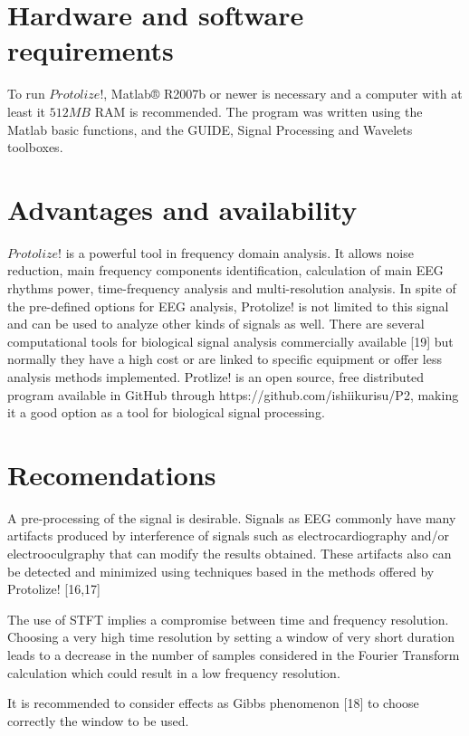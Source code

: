\documentclass[12pt, a4paper]{article}
\begin{document}
\section{Hardware and software requirements}

To run $Protolize!$, Matlab® R2007b or newer is necessary and a computer with at least it $512MB$ RAM is recommended. The program was written using the Matlab basic functions, and the GUIDE, Signal Processing and Wavelets toolboxes.

\section{Advantages and availability}

$Protolize!$ is a powerful tool in frequency domain analysis. It allows noise reduction, main frequency components identification, calculation of main EEG rhythms power, time-frequency analysis and multi-resolution analysis. In spite of the pre-defined options for EEG analysis, Protolize! is not limited to this signal and can be used to analyze other kinds of signals as well. There are several computational tools for biological signal analysis commercially available [19] but normally they have a high cost or are linked to specific equipment or offer less analysis methods implemented. Protlize! is an open source, free distributed program available in GitHub through https://github.com/ishiikurisu/P2, making it a good option as a tool for biological signal processing. 

\section{Recomendations}

A pre-processing of the signal is desirable. Signals as EEG commonly have many artifacts produced by interference of signals such as electrocardiography and/or electrooculgraphy that can modify the results obtained. These artifacts also can be detected and minimized using techniques based in the methods offered by Protolize! [16,17] 

The use of STFT implies a compromise between time and frequency resolution. Choosing a very high time resolution by setting a window of very short duration leads to a decrease in the number of samples considered in the Fourier Transform calculation which could result in a low frequency resolution. 

It is recommended to consider effects as Gibbs phenomenon [18] to choose correctly the window to be used.
\end{document}

